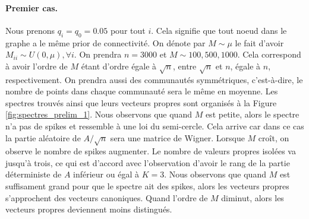 \documentclass[../../main.tex]{subfiles} %
\begin{document}
\paragraph{Premier cas.} Nous prenons $q_i = q_0 = 0.05$ pour tout $i$. Cela 
signifie que tout noeud dans le graphe a le même prior de connectivité. On 
dénote par $M \sim \mu$ le fait d'avoir $M_{ii} \sim U\left(0, \mu \right), 
\forall i$. On prendra $n = 3000$ et $M \sim 100, 500, 1000$. Cela correspond 
à avoir l'ordre de $M$ étant d'ordre égale à $\sqrt{n}$, entre $\sqrt n$ et $n$,
égale à $n$, respectivement. On prendra aussi des communautés symmétriques, 
c'est-à-dire, le nombre de points dans chaque communauté sera le même en moyenne.
Les spectres trouvés ainsi que leurs vecteurs propres sont organisés à la Figure 
\ref{fig:spectres_prelim_1}. 
Nous observons que quand $M$ est petite, alors le spectre n'a pas de spikes et 
ressemble à une loi du semi-cercle. Cela arrive car dans ce cas la partie
aléatoire de $A/\sqrt n$ sera une matrice de Wigner.
Lorsque $M$ croît, on observe le nombre de spikes augmenter. Le nombre de 
valeurs propres isolées va jusqu'à trois, ce qui est d'accord avec l'observation
d'avoir le rang de la partie déterministe de $A$ inférieur ou égal à $K=3$.
Nous observons que quand $M$ est suffisament grand pour que le spectre ait des 
spikes, alors les vecteurs propres s'approchent des vecteurs canoniques. Quand 
l'ordre de $M$ diminut, alors les vecteurs propres deviennent moins distingués.
\end{document}
